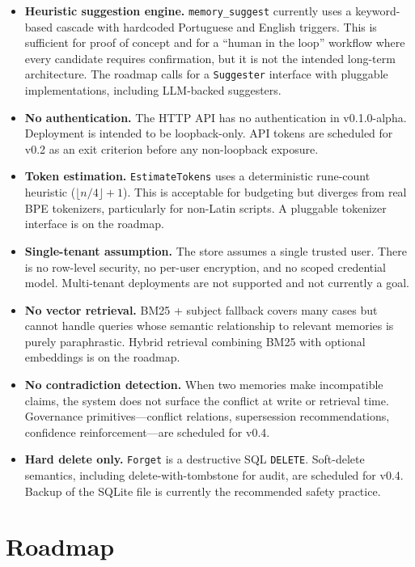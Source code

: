 \documentclass[11pt,a4paper]{article}
\begin{document}
\begin{itemize}
 \item \textbf{Heuristic suggestion engine.} \texttt{memory\_suggest} currently uses a keyword-based cascade with hardcoded Portuguese and English triggers. This is sufficient for proof of concept and for a ``human in the loop'' workflow where every candidate requires confirmation, but it is not the intended long-term architecture. The roadmap calls for a \texttt{Suggester} interface with pluggable implementations, including LLM-backed suggesters.
 \item \textbf{No authentication.} The HTTP API has no authentication in v0.1.0-alpha. Deployment is intended to be loopback-only. API tokens are scheduled for v0.2 as an exit criterion before any non-loopback exposure.
 \item \textbf{Token estimation.} \texttt{EstimateTokens} uses a deterministic rune-count heuristic ($\lfloor n/4 \rfloor + 1$). This is acceptable for budgeting but diverges from real BPE tokenizers, particularly for non-Latin scripts. A pluggable tokenizer interface is on the roadmap.
 \item \textbf{Single-tenant assumption.} The store assumes a single trusted user. There is no row-level security, no per-user encryption, and no scoped credential model. Multi-tenant deployments are not supported and not currently a goal.
 \item \textbf{No vector retrieval.} BM25 + subject fallback covers many cases but cannot handle queries whose semantic relationship to relevant memories is purely paraphrastic. Hybrid retrieval combining BM25 with optional embeddings is on the roadmap.
 \item \textbf{No contradiction detection.} When two memories make incompatible claims, the system does not surface the conflict at write or retrieval time. Governance primitives---conflict relations, supersession recommendations, confidence reinforcement---are scheduled for v0.4.
 \item \textbf{Hard delete only.} \texttt{Forget} is a destructive SQL \texttt{DELETE}. Soft-delete semantics, including delete-with-tombstone for audit, are scheduled for v0.4. Backup of the SQLite file is currently the recommended safety practice.
\end{itemize}

\section{Roadmap}
\end{document}
